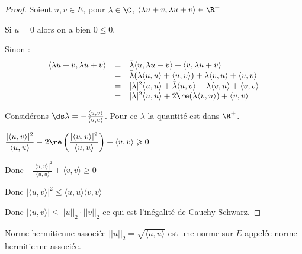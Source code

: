 \begin{proof}
    Soient $u, v \in E$, pour $\lambda \in \C$, $\langle\lambda u + v, \lambda u + v\rangle \in \R^+ $

    Si $u = 0$ alors on a bien $0 \leqslant 0$.

    Sinon :
    \[
    \begin{array}{rcl}
        \langle\lambda u + v, \lambda u + v\rangle & = & \bar \lambda \langle u, \lambda u + v \rangle + \langle v, \lambda u + v\rangle \\
        \space & = & \bar \lambda (\lambda \langle u, u \rangle + \langle u, v \rangle ) + \lambda \langle v, u \rangle + \langle v, v \rangle \\
        \space & = & |\lambda|^2 \langle u, u \rangle + \bar \lambda  \langle u, v \rangle + \lambda \langle v, u \rangle + \langle v, v \rangle \\
        \space & = & |\lambda|^2 \langle u, u \rangle + 2 \re(\lambda \langle v, u \rangle) + \langle v, v \rangle \\
    \end{array}
    \]

    Considérons $\ds \lambda = - \frac{\langle u, v \rangle }{\langle u, u \rangle}$. Pour ce $\lambda$ la quantité est dans
    $\R^+$.

    $\displaystyle \frac{|\langle u, v \rangle|^2}{\langle u, u \rangle} - 2 \re \left(\frac{|\langle u, v \rangle|^2}{\langle u, u \rangle}\right) + \langle v, v \rangle \geqslant 0$

    Donc $\displaystyle - \frac{|\langle u, v \rangle|^2}{\langle u, u \rangle} + \langle v, v \rangle \geqslant 0$

    Donc $|\langle u, v \rangle|^2 \leqslant \langle u, u \rangle \langle v, v \rangle$

    Donc $|\langle u, v \rangle| \leqslant ||u||_2 \cdot ||v||_2$ ce qui est l'inégalité de Cauchy Schwarz. 
\end{proof}

\begin{theoreme}{Norme hermitienne associée}{}
    $||u||_2 = \sqrt{\langle u, u \rangle}$ est une norme sur $E$ appelée norme hermitienne associée. 
\end{theoreme}


